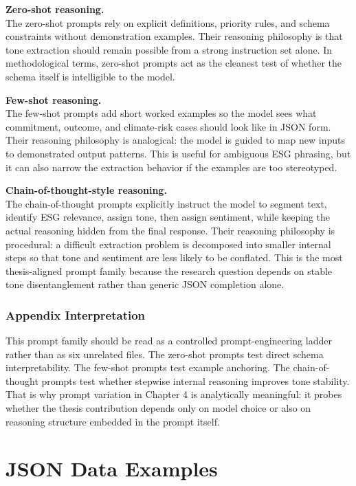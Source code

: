\textbf{Zero-shot reasoning.}\\
The zero-shot prompts rely on explicit definitions, priority rules, and schema constraints without demonstration examples. Their reasoning philosophy is that tone extraction should remain possible from a strong instruction set alone. In methodological terms, zero-shot prompts act as the cleanest test of whether the schema itself is intelligible to the model.

\textbf{Few-shot reasoning.}\\
The few-shot prompts add short worked examples so the model sees what commitment, outcome, and climate-risk cases should look like in JSON form. Their reasoning philosophy is analogical: the model is guided to map new inputs to demonstrated output patterns. This is useful for ambiguous ESG phrasing, but it can also narrow the extraction behavior if the examples are too stereotyped.

\textbf{Chain-of-thought-style reasoning.}\\
The chain-of-thought prompts explicitly instruct the model to segment text, identify ESG relevance, assign tone, then assign sentiment, while keeping the actual reasoning hidden from the final response. Their reasoning philosophy is procedural: a difficult extraction problem is decomposed into smaller internal steps so that tone and sentiment are less likely to be conflated. This is the most thesis-aligned prompt family because the research question depends on stable tone disentanglement rather than generic JSON completion alone.

\subsubsection{Appendix Interpretation}\label{appendix-interpretation}

This prompt family should be read as a controlled prompt-engineering ladder rather than as six unrelated files. The zero-shot prompts test direct schema interpretability. The few-shot prompts test example anchoring. The chain-of-thought prompts test whether stepwise internal reasoning improves tone stability. That is why prompt variation in Chapter 4 is analytically meaningful: it probes whether the thesis contribution depends only on model choice or also on reasoning structure embedded in the prompt itself.

\section{JSON Data Examples}\label{json-data-examples}

